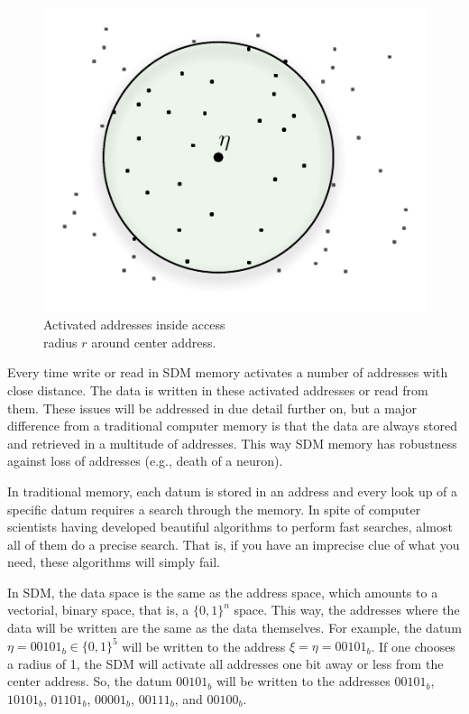 \begin{figure}[!htb]
\centering\includegraphics[scale=0.75]{./images02/p_circle_r.pdf}

\caption{Activated addresses inside access \protect \\
radius $r$ around center address.\label{fig-addresses-inside-access-radius}}
\end{figure}



Every time write or read in SDM memory activates a number of addresses with close distance.  The data is written in these activated addresses or read from them.  These issues will be addressed in due detail further on, but a major difference from a traditional computer memory is that the data are always stored and retrieved in a multitude of addresses. This way SDM memory has robustness against loss of addresses (e.g., death of a neuron).

In traditional memory, each datum is stored in an address and every look up of a specific datum requires a search through the memory. In spite of computer scientists having developed beautiful algorithms to perform fast searches, almost all of them do a precise search. That is, if you have an imprecise clue of what you need, these algorithms will simply fail.

In SDM, the data space is the same as the address space, which amounts to a vectorial, binary space, that is, a $\{0,1\}^{n}$ space. This way, the addresses where the data will be written are the same as the data themselves. For example, the datum $\eta=00101_{b}\in\{0,1\}^{5}$ will be written to the address $\xi=\eta=00101_{b}$. If one chooses a radius of 1, the SDM will activate all addresses one bit away or less from the center address. So, the datum $00101_{b}$ will be written to the addresses $00101_{b}$, $10101_{b}$, $01101_{b}$, $00001_{b}$, $00111_{b}$, and $00100_{b}$.

